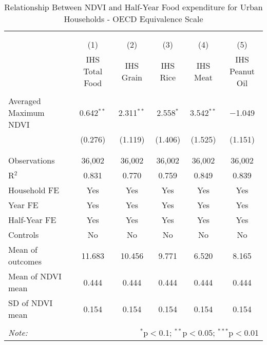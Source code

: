 
\begin{table}[!htbp] \centering 
  \caption{Relationship Between NDVI and Half-Year Food expenditure for Urban Households - OECD Equivalence Scale} 
  \label{ndvi_table_6_rural.tex} 
\normalsize 
\begin{tabular}{@{\extracolsep{5pt}}lccccc} 
\\[-1.8ex]\hline 
\hline \\[-1.8ex] 
\\[-1.8ex] & (1) & (2) & (3) & (4) & (5)\\ 
 & IHS Total Food & IHS Grain & IHS Rice & IHS Meat & IHS Peanut Oil \\ 
\hline \\[-1.8ex] 
 Averaged Maximum NDVI & 0.642$^{**}$ & 2.311$^{**}$ & 2.558$^{*}$ & 3.542$^{**}$ & $-$1.049 \\ 
  & (0.276) & (1.119) & (1.406) & (1.525) & (1.151) \\ 
  & & & & & \\ 
\hline \\[-1.8ex] 
Observations & 36,002 & 36,002 & 36,002 & 36,002 & 36,002 \\ 
R$^{2}$ & 0.831 & 0.770 & 0.759 & 0.849 & 0.839 \\ 
Household FE & Yes & Yes & Yes & Yes & Yes \\ 
Year FE & Yes & Yes & Yes & Yes & Yes \\ 
Half-Year FE & Yes & Yes & Yes & Yes & Yes \\ 
Controls & No & No & No & No & No \\ 
Mean of outcomes & 11.683 & 10.456 & 9.771 & 6.520 & 8.165 \\ 
Mean of NDVI mean & 0.444 & 0.444 & 0.444 & 0.444 & 0.444 \\ 
SD of NDVI mean & 0.154 & 0.154 & 0.154 & 0.154 & 0.154 \\ 
\hline \\[-1.8ex] 
\textit{Note:}  & \multicolumn{5}{r}{$^{*}$p$<$0.1; $^{**}$p$<$0.05; $^{***}$p$<$0.01} \\ 
\end{tabular} 
\end{table} 
